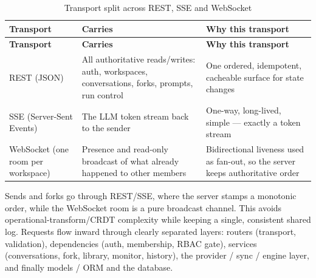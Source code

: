 \documentclass[12pt,a4paper]{report}
\begin{document}
\begingroup
\setlength{\parskip}{0pt}\renewcommand{\arraystretch}{1.32}\footnotesize
\begin{xltabular}{\textwidth}{>{\hsize\raggedright\arraybackslash}X >{\hsize\raggedright\arraybackslash}X >{\hsize\raggedright\arraybackslash}X}
\caption{Transport split across REST, SSE and WebSocket}\\
\toprule
\textbf{Transport} & \textbf{Carries} & \textbf{Why this transport} \\
\midrule\endfirsthead
\toprule
\textbf{Transport} & \textbf{Carries} & \textbf{Why this transport} \\
\midrule\endhead
\bottomrule\endfoot
REST (JSON) & All authoritative reads/writes: auth, workspaces, conversations, forks, prompts, run control & One ordered, idempotent, cacheable surface for state changes \\
SSE (Server-Sent Events) & The LLM token stream back to the sender & One-way, long-lived, simple --- exactly a token stream \\
WebSocket (one room per workspace) & Presence and read-only broadcast of what already happened to other members & Bidirectional liveness used as fan-out, so the server keeps authoritative order \\
\end{xltabular}
\endgroup

Sends and forks go through REST/SSE, where the server stamps a monotonic order, while the WebSocket room is a pure broadcast channel. This avoids operational-transform/CRDT complexity while keeping a single, consistent shared log. Requests flow inward through clearly separated layers: routers (transport, validation), dependencies (auth, membership, RBAC gate), services (conversations, fork, library, monitor, history), the provider / sync / engine layer, and finally models / ORM and the database.
\end{document}
